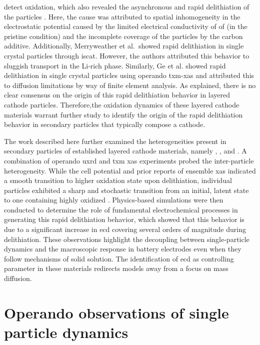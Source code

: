 \documentclass{article}
\begin{document}
detect oxidation, which also revealed the asynchronous and rapid
delithiation of the \nmc[532]{} particles \cite{zhao2022}. Here, the
cause was attributed to spatial inhomogeneity in the electrostatic
potential caused by the limited electrical conductivity of of
\nmc[532]{} (in the pristine condition) and the incomplete coverage of
the \nmc[532]{} particles by the carbon additive. Additionally,
Merryweather et al.\cite{rao2021}\ showed rapid delithiation in
 single crystal particles through \gls{iscat}. However, the
authors attributed this behavior to sluggish  transport in the Li-rich phase. Similarly, Ge et al.\cite{wang2020-6} showed rapid
delithiation in \nmc{} single crystal particles using operando
\gls{txm}-\gls{xas} and attributed this to  diffusion
limitations by way of finite element analysis. As explained, there is
no clear consensus on the origin of this rapid delithiation behavior
in layered cathode particles. Therefore,the oxidation dynamics of
these layered cathode materials warrant further study to identify the
origin of the rapid delithiation behavior in secondary
particles that typically compose a cathode.


The work described here further examined the heterogeneities present
in secondary particles of established layered cathode materials,
namely \nca{}, \nmc[333]{}, and \nmc[532]{}. A combination of operando
\gls{uxrd} and \gls{txm} \gls{xas} experiments probed the
inter-particle heterogeneity. While the cell potential and prior
reports of ensemble \gls{xas} indicated a smooth transition to higher
oxidation state upon delithiation\cite{deb2005,muto2009}, individual
particles exhibited a sharp and stochastic transition from an initial,
latent state to one containing highly oxidized . Physics-based
simulations were then conducted to determine the role of fundamental
electrochemical processes in generating this rapid delithiation
behavior, which showed that this behavior is due to a significant
increase in \gls{ecd} covering several orders of magnitude during
delithiation. These observations highlight the decoupling between
single-particle dynamics and the macroscopic response in battery
electrodes even when they follow mechanisms of solid solution. The
identification of \gls{ecd} as controlling parameter in these
materials redirects models away from a focus on mass diffusion.

\section{Operando observations of single particle dynamics}
\end{document}
